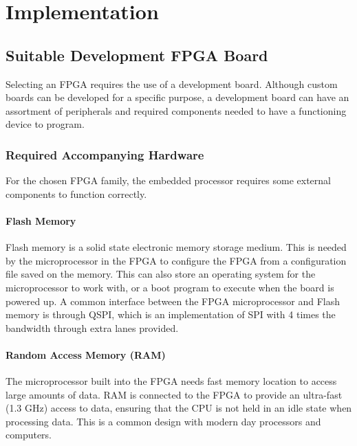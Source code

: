 \chapter{Implementation}\label{C:impl}

\section{Suitable Development FPGA Board}

\par Selecting an FPGA requires the use of a development board. Although custom boards can be developed for a 
specific purpose, a development board can have an assortment of peripherals and required components needed to 
have a functioning device to program. 

\subsection{Required Accompanying Hardware}

\par For the chosen FPGA family, the embedded processor requires some external components to function correctly.

\subsubsection{Flash Memory}

\par Flash memory is a solid state electronic memory storage medium. This is needed by the microprocessor in 
the FPGA to configure the FPGA from a configuration file saved on the memory. This can also store an operating 
system for the microprocessor to work with, or a boot program to execute when the board is powered up. A common 
interface between the FPGA microprocessor and Flash memory is through QSPI, which is an implementation of SPI with 
4 times the bandwidth through extra lanes provided. 

\subsubsection{Random Access Memory (RAM)}

\par The microprocessor built into the FPGA needs fast memory location to access large amounts of data. RAM is 
connected to the FPGA to provide an ultra-fast (1.3 GHz) access to data, ensuring that the CPU is not held in an 
idle state when processing data. This is a common design with modern day processors and computers.


